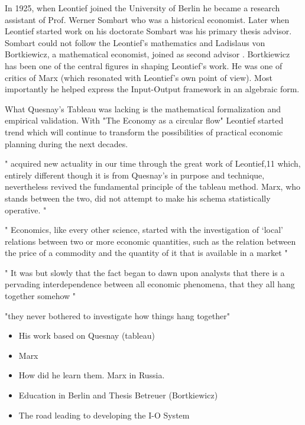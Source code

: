 \documentclass[12pt,a4paper]{scrartcl}
\begin{document}
	In 1925, when Leontief joined the University of Berlin he became a research assistant of Prof. Werner Sombart who was a historical economist. Later when Leontief started work on his doctorate Sombart was his primary thesis advisor. Sombart could not follow the Leontief's mathematics and Ladislaus von Bortkiewicz, a mathematical economist, joined as second advisor \cite[p.513]{Baumol2009}. Bortkiewicz has been one of the central figures in shaping Leontief's work. He was one of critics of Marx (which resonated with Leontief's own point of view). Most importantly he helped express the Input-Output framework in an algebraic form.
	
	What Quesnay's Tableau was lacking is the mathematical formalization and empirical validation. With "The Economy as a circular flow" \cite{Leontief1991} Leontief started trend which will continue to transform the possibilities of practical economic planning during the next decades.
	
	"
	acquired new actuality in our time through the great work of Leontief,11 which, entirely different though it is from Quesnay’s in purpose and technique, nevertheless revived the fundamental principle of the tableau method. Marx, who stands between the two, did not attempt to make his schema statistically operative.
	"
	
	"
	Economics, like every other science, started with the investigation of ‘local’
	relations between two or more economic
	quantities, such as the relation between the price of a commodity and the quantity of it that is available in a market
	"
	
	"
	It was but slowly that
	the fact began to dawn upon analysts that there is a pervading
	interdependence between all economic phenomena, that they all hang together somehow
	"
	
	"they never bothered to investigate how things hang together"
	\cite[p.232]{Schumpeter1954}
	
	
	
	\begin{itemize}
		\item His work based on Quesnay (tableau)
		\item Marx
		\item How did he learn them. Marx in Russia.
		\item Education in Berlin and Thesis Betreuer (Bortkiewicz)
		
		\item The road leading to developing the I-O System
	\end{itemize}
	
\end{document}
